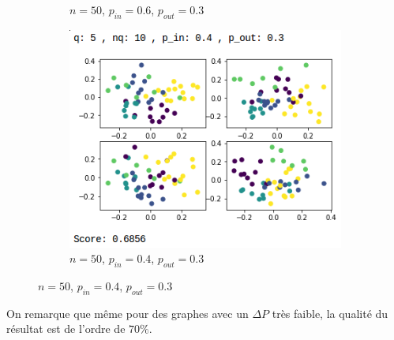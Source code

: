 \begin{figure}[H]
\begin{subfigure}{.5\textwidth}
		\caption{$n=50$, $p_{in}=0.6$, $p_{out}=0.3$}
		\label{n50pin06pout03}
	\end{subfigure}
	\begin{subfigure}{.5\textwidth}
		\centering
		\includegraphics[scale=0.58]{static/q5_nq10_pin04_pout03.png}
		\caption{$n=50$, $p_{in}=0.4$, $p_{out}=0.3$}
		\label{n50pin04pout03}
	\end{subfigure}
\end{figure}

On remarque que même pour des graphes avec un $\Delta P$ très faible, la qualité du résultat est de l'ordre de $70\%$.